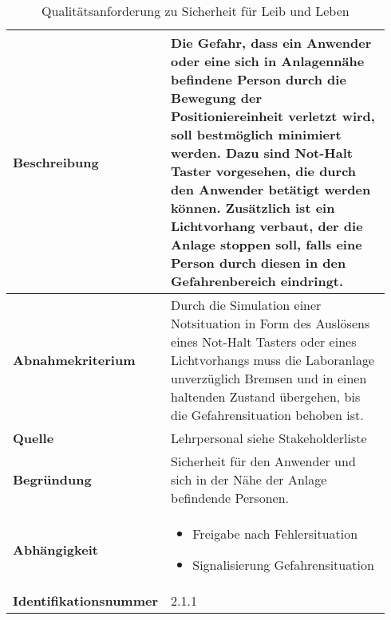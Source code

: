 \documentclass[../Bachelorarbeit.tex]{subfiles}
\begin{document}
\begin{table}[H]
    \centering
    \begin{tabular}{| p{0.34\linewidth} | p{0.6\linewidth} |}
        \hline
        \textbf{Beschreibung} & Die Gefahr, dass ein Anwender oder eine sich in Anlagennähe befindene Person durch die Bewegung der Positioniereinheit verletzt wird, soll bestmöglich minimiert werden. Dazu sind Not-Halt Taster vorgesehen, die durch den Anwender betätigt werden können. Zusätzlich ist ein Lichtvorhang verbaut, der die Anlage stoppen soll, falls eine Person durch diesen in den Gefahrenbereich eindringt. \\ \hline
        \textbf{Abnahmekriterium} & Durch die Simulation einer Notsituation in Form des Auslösens eines Not-Halt Tasters oder eines Lichtvorhangs muss die Laboranlage unverzüglich Bremsen und in einen haltenden Zustand übergehen, bis die Gefahrensituation behoben ist. \\ \hline
        \textbf{Quelle} & Lehrpersonal siehe Stakeholderliste \\ \hline
        \textbf{Begründung} & Sicherheit für den Anwender und sich in der Nähe der Anlage befindende Personen. \\ \hline
        \textbf{Abhängigkeit} & {\begin{itemize}[noitemsep,topsep=0pt,parsep=0pt,partopsep=0pt,leftmargin=*]
                                    \item Freigabe nach Fehlersituation
                                    \item Signalisierung Gefahrensituation
                                \end{itemize}} \\ \hline
        \textbf{Identifikationsnummer} & 2.1.1 \\ \hline
    \end{tabular}
    \caption[\acs{nfa} - Sicherheit für Leib und Leben]{Qualitätsanforderung zu Sicherheit für Leib und Leben}
    \label{tab:my-table11}
\end{table}
\end{document}
